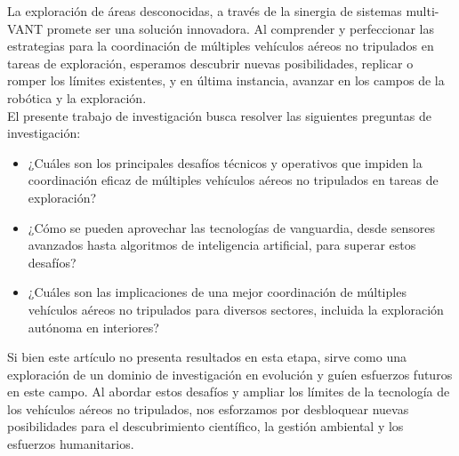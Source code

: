 \documentclass[sigconf]{acmart}
\begin{document}
La exploración de áreas desconocidas, a través de la sinergia de sistemas multi-VANT promete ser una solución innovadora. Al comprender y perfeccionar las estrategias para la coordinación de múltiples vehículos aéreos no tripulados en tareas de exploración, esperamos descubrir nuevas posibilidades, replicar o romper los límites existentes, y en última instancia, avanzar en los campos de la robótica y la exploración.\\

El presente trabajo de investigación busca resolver las siguientes preguntas de investigación:

\begin{itemize}
  \item ¿Cuáles son los principales desafíos técnicos y operativos que impiden la coordinación eficaz de múltiples vehículos aéreos no tripulados en tareas de exploración?
  \item ¿Cómo se pueden aprovechar las tecnologías de vanguardia, desde sensores avanzados hasta algoritmos de inteligencia artificial, para superar estos desafíos?
  \item ¿Cuáles son las implicaciones de una mejor coordinación de múltiples vehículos aéreos no tripulados para diversos sectores, incluida la exploración autónoma en interiores?
\end{itemize}


Si bien este artículo no presenta resultados en esta etapa, sirve como una exploración de un dominio de investigación en evolución y guíen esfuerzos futuros en este campo. Al abordar estos desafíos y ampliar los límites de la tecnología de los vehículos aéreos no tripulados, nos esforzamos por desbloquear nuevas posibilidades para el descubrimiento científico, la gestión ambiental y los esfuerzos humanitarios.

\end{document}
